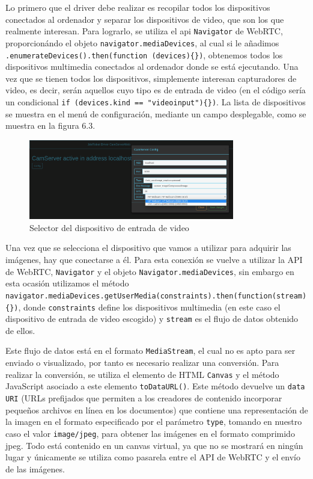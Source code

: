 Lo primero que el driver debe realizar es recopilar todos los dispositivos conectados al ordenador y separar los dispositivos de video, que son los que realmente interesan. Para lograrlo, se utiliza el api \texttt{Navigator} de WebRTC, proporcionándo el objeto \texttt{navigator.mediaDevices}, al cual si le añadimos \texttt{.enumerateDevices().then(function (devices)\{\})}, obtenemos todos los dispositivos multimedia conectados al ordenador donde se está ejecutando. Una vez que se tienen todos los dispositivos, simplemente interesan capturadores de video, es decir, serán aquellos cuyo tipo es de entrada de video (en el código sería un condicional \texttt{if (devices.kind == "videoinput")\{\})}. La lista de dispositivos se muestra en el menú de configuración, mediante un campo desplegable, como se muestra en la figura 6.3.
 \begin{figure}[H]
  \begin{center}
    \includegraphics[width=0.8\textwidth]{figures/devicecamserver.png}
		\caption{Selector del dispositivo de entrada de video}
		\label{fig.devicecamserver}
		\end{center}
\end{figure}
Una vez que se selecciona el dispositivo que vamos a utilizar para adquirir las imágenes, hay que conectarse a él. Para esta conexión se vuelve a utilizar la API de WebRTC, \texttt{Navigator} y el objeto \texttt{Navigator.mediaDevices}, sin embargo en esta ocasión utilizamos el método \texttt{navigator.mediaDevices.getUserMedia(constraints).then(function(stream) \{\})}, donde \texttt{constraints} define los dispositivos multimedia (en este caso el dispositivo de entrada de video escogido) y \texttt{stream} es el flujo de datos obtenido de ellos.

Este flujo de datos está en el formato \texttt{MediaStream}, el cual no es apto para ser enviado o visualizado, por tanto es necesario realizar una conversión. Para realizar la conversión, se utiliza el elemento de HTML \texttt{Canvas} y el método JavaScript asociado a este elemento \texttt{toDataURL()}. Este método devuelve un \texttt{data URI} (URLs prefijados que permiten a los creadores de contenido incorporar pequeños archivos en línea en los documentos) que contiene una representación de la imagen en el formato especificado por el parámetro \texttt{type}, tomando en nuestro caso el valor \texttt{image/jpeg}, para obtener las imágenes en el formato comprimido jpeg. Todo está contenido en un canvas virtual, ya que no se mostrará en ningún lugar y únicamente se utiliza como pasarela entre el API de WebRTC y el envío de las imágenes.

